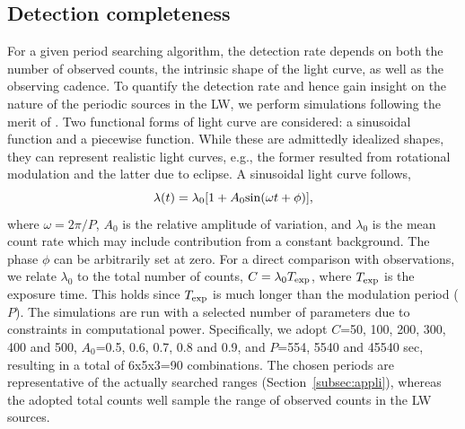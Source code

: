 \documentclass[fleqn,usenatbib]{mnras}
\begin{document}
\subsection{Detection completeness}\label{subsec:simulation}
For a given period searching algorithm, the detection rate depends on both the number of observed counts, the intrinsic shape of the light curve, as well as the observing cadence. 
To quantify the detection rate and hence gain insight on the nature of the periodic sources in the LW, we perform simulations following the merit of \citet{1998ApJ...498..666C}. 
Two functional forms of light curve are considered: a sinusoidal function and a piecewise function. While these are admittedly idealized shapes, they can represent realistic light curves, e.g., the former resulted from rotational modulation and the latter due to eclipse. 
A sinusoidal light curve follows,
\begin{equation}
\lambda (t)=\lambda_0[1+A_{0}{\rm sin}(\omega t+\phi)], 
\label{eqn:sin}
\end{equation}
where $\omega = 2{\pi}/P$, $A_0$ is the relative amplitude of variation, and $\lambda_0$ is the mean count rate which may include contribution from a constant background. The phase $\phi$ can be arbitrarily set at zero.
For a direct comparison with observations, we relate $\lambda_0$ to the total number of counts, $C = \lambda_0 T_{\rm exp}$, where $T_{\rm exp}$ is the exposure time. This holds since $T_{\rm exp}$ is much longer than the modulation period ($P$). 
The simulations are run with a selected number of parameters due to constraints in computational power. 
Specifically, we adopt $C$=50, 100, 200, 300, 400 and 500, $A_0$=0.5, 0.6, 0.7, 0.8 and 0.9, and $P$=554, 5540 and 45540 sec, resulting in a total of 6x5x3=90 combinations. 
The chosen periods are representative of the actually searched ranges (Section~\ref{subsec:appli}), whereas
the adopted total counts well sample the range of observed counts in the LW sources.
\end{document}
